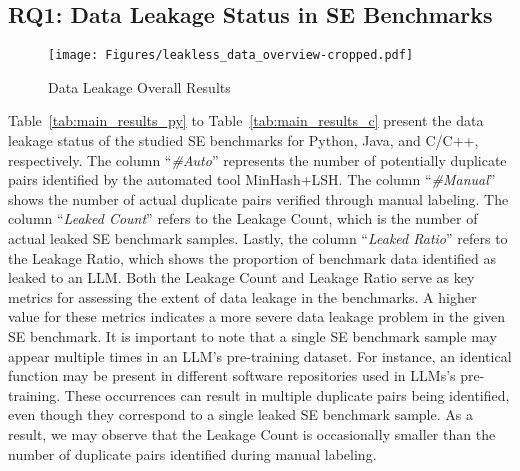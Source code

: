 \subsection{RQ1: Data Leakage Status in SE Benchmarks}




\begin{figure}[t] 
    \centering
    \texttt{[image: Figures/leakless\_data\_overview-cropped.pdf]} 
    \vspace{-0.2cm}
    \caption{Data Leakage Overall Results} 
    \vspace{-0.3cm}
    \label{fig:data_review}
\end{figure}








Table~\ref{tab:main_results_py} to Table~\ref{tab:main_results_c} present the data leakage status of the studied SE benchmarks for Python, Java, and C/C++, respectively. The column ``\textit{\#Auto}'' represents the number of potentially duplicate pairs identified by the automated tool MinHash+LSH. The column ``\textit{\#Manual}'' shows the number of actual duplicate pairs verified through manual labeling. The column ``\textit{Leaked Count}'' refers to the Leakage Count, which is the number of actual leaked SE benchmark samples. Lastly, the column ``\textit{Leaked Ratio}'' refers to the Leakage Ratio, which shows the proportion of benchmark data identified as leaked to an LLM.
Both the Leakage Count and Leakage Ratio serve as key metrics for assessing the extent of data leakage in the benchmarks. A higher value for these metrics indicates a more severe data leakage problem in the given SE benchmark.
It is important to note that a single SE benchmark sample may appear multiple times in an LLM's pre-training dataset. For instance, an identical function may be present in different software repositories used in LLMs's pre-training. These occurrences can result in multiple duplicate pairs being identified, even though they correspond to a single leaked SE benchmark sample. As a result, we may observe that the Leakage Count is occasionally smaller than the number of duplicate pairs identified during manual labeling.







 \vspace{-0.1cm}

